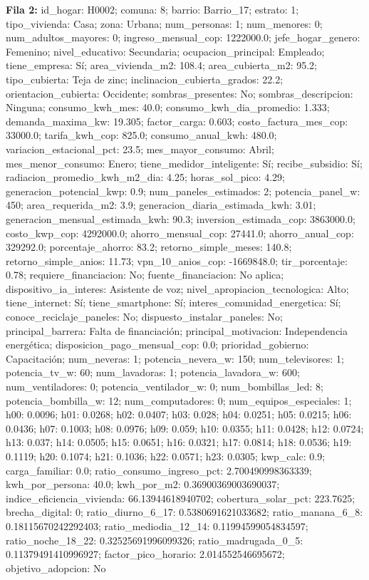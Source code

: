 {\footnotesize\textbf{Fila 2:} id\_hogar: H0002; comuna: 8; barrio: Barrio\_17; estrato: 1; tipo\_vivienda: Casa; zona: Urbana; num\_personas: 1; num\_menores: 0; num\_adultos\_mayores: 0; ingreso\_mensual\_cop: 1222000.0; jefe\_hogar\_genero: Femenino; nivel\_educativo: Secundaria; ocupacion\_principal: Empleado; tiene\_empresa: Sí; area\_vivienda\_m2: 108.4; area\_cubierta\_m2: 95.2; tipo\_cubierta: Teja de zinc; inclinacion\_cubierta\_grados: 22.2; orientacion\_cubierta: Occidente; sombras\_presentes: No; sombras\_descripcion: Ninguna; consumo\_kwh\_mes: 40.0; consumo\_kwh\_dia\_promedio: 1.333; demanda\_maxima\_kw: 19.305; factor\_carga: 0.603; costo\_factura\_mes\_cop: 33000.0; tarifa\_kwh\_cop: 825.0; consumo\_anual\_kwh: 480.0; variacion\_estacional\_pct: 23.5; mes\_mayor\_consumo: Abril; mes\_menor\_consumo: Enero; tiene\_medidor\_inteligente: Sí; recibe\_subsidio: Sí; radiacion\_promedio\_kwh\_m2\_dia: 4.25; horas\_sol\_pico: 4.29; generacion\_potencial\_kwp: 0.9; num\_paneles\_estimados: 2; potencia\_panel\_w: 450; area\_requerida\_m2: 3.9; generacion\_diaria\_estimada\_kwh: 3.01; generacion\_mensual\_estimada\_kwh: 90.3; inversion\_estimada\_cop: 3863000.0; costo\_kwp\_cop: 4292000.0; ahorro\_mensual\_cop: 27441.0; ahorro\_anual\_cop: 329292.0; porcentaje\_ahorro: 83.2; retorno\_simple\_meses: 140.8; retorno\_simple\_anios: 11.73; vpn\_10\_anios\_cop: -1669848.0; tir\_porcentaje: 0.78; requiere\_financiacion: No; fuente\_financiacion: No aplica; dispositivo\_ia\_interes: Asistente de voz; nivel\_apropiacion\_tecnologica: Alto; tiene\_internet: Sí; tiene\_smartphone: Sí; interes\_comunidad\_energetica: Sí; conoce\_reciclaje\_paneles: No; dispuesto\_instalar\_paneles: No; principal\_barrera: Falta de financiación; principal\_motivacion: Independencia energética; disposicion\_pago\_mensual\_cop: 0.0; prioridad\_gobierno: Capacitación; num\_neveras: 1; potencia\_nevera\_w: 150; num\_televisores: 1; potencia\_tv\_w: 60; num\_lavadoras: 1; potencia\_lavadora\_w: 600; num\_ventiladores: 0; potencia\_ventilador\_w: 0; num\_bombillas\_led: 8; potencia\_bombilla\_w: 12; num\_computadores: 0; num\_equipos\_especiales: 1; h00: 0.0096; h01: 0.0268; h02: 0.0407; h03: 0.028; h04: 0.0251; h05: 0.0215; h06: 0.0436; h07: 0.1003; h08: 0.0976; h09: 0.059; h10: 0.0355; h11: 0.0428; h12: 0.0724; h13: 0.037; h14: 0.0505; h15: 0.0651; h16: 0.0321; h17: 0.0814; h18: 0.0536; h19: 0.1119; h20: 0.1074; h21: 0.1036; h22: 0.0571; h23: 0.0305; kwp\_calc: 0.9; carga\_familiar: 0.0; ratio\_consumo\_ingreso\_pct: 2.700490998363339; kwh\_por\_persona: 40.0; kwh\_por\_m2: 0.36900369003690037; indice\_eficiencia\_vivienda: 66.13944618940702; cobertura\_solar\_pct: 223.7625; brecha\_digital: 0; ratio\_diurno\_6\_17: 0.5380691621033682; ratio\_manana\_6\_8: 0.18115670242292403; ratio\_mediodia\_12\_14: 0.11994599054834597; ratio\_noche\_18\_22: 0.32525691996099326; ratio\_madrugada\_0\_5: 0.11379491410996927; factor\_pico\_horario: 2.014552546695672; objetivo\_adopcion: No\par}
